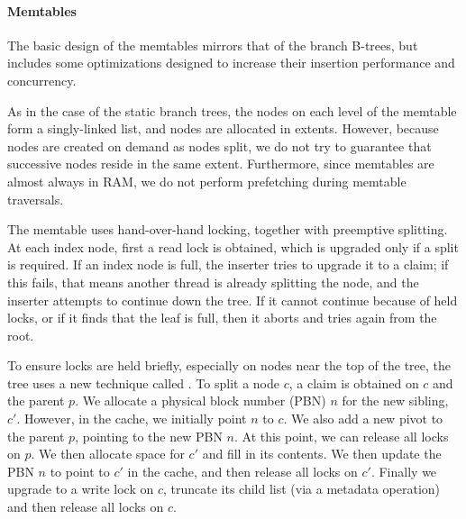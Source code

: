 \paragraph{Memtables}
The basic design of the memtables mirrors that of the branch B-trees, but
includes some optimizations designed to increase their insertion performance
and concurrency.

As in the case of the static branch trees, the nodes on each level of the
memtable form a singly-linked list, and nodes are allocated in extents.
However, because nodes are created on
demand as nodes split, we do not try to guarantee that successive nodes
reside in the same extent.  Furthermore, since memtables are almost always
in RAM, we do not perform prefetching during memtable traversals.

The memtable uses hand-over-hand locking, together with preemptive
splitting. At each index node, first a read lock is obtained, which is
upgraded only if a split is required. If an index node is full, the
inserter tries to upgrade it to a claim; if this fails, that means
another thread is already splitting the node, and the inserter
attempts to continue down the tree.  If it cannot continue because of
held locks, or if it finds that the leaf is full, then it aborts and
tries again from the root.

To ensure locks are held briefly, especially on nodes near the top of
the tree, the tree uses a new technique called . To split a node $c$, a claim is obtained on $c$ and the
parent $p$. We allocate a physical block number (PBN) $n$ for the new
sibling, $c'$.  However, in the cache, we initially point $n$ to $c$.
We also add a new pivot to the parent $p$, pointing to the new PBN
$n$.  At this point, we can release all locks on $p$.  We then
allocate space for $c'$ and fill in its contents.  We then update the
PBN $n$ to point to $c'$ in the cache, and then release all locks on
$c'$.  Finally we upgrade to a write lock on $c$, truncate its child
list (via a metadata operation) and then release all locks on $c$.

